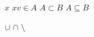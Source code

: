 \documentclass[11 pt]{article}
\begin{document}
$x$
$xv\in A$
$A \subset B$
$A\subseteq B$

$\cup$
$\cap$
$\setminus$


\vspace{1 in}
\hspace{1 in}
\end{document}
